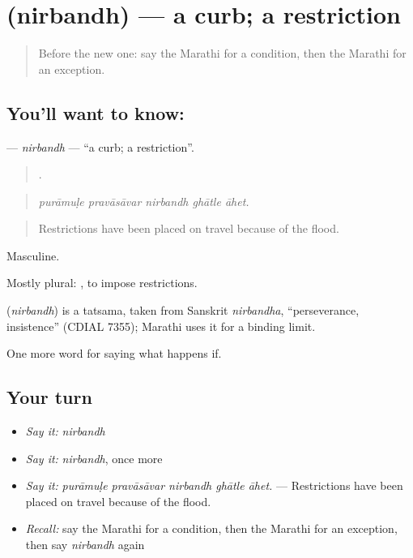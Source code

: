 \section[\texorpdfstring{\mr{निर्बंध} (nirbandh)}{निर्बंध (nirbandh)}]{ (nirbandh) — a curb; a restriction}

\label{lesson:MR-C378-nirbandh}



\begin{quote}
Before the new one: say the Marathi for a condition, then the Marathi for an exception.
\end{quote}

\subsection*{You'll want to know: }
\textbf{} — \emph{nirbandh} — \textquotedblleft{}a curb; a restriction\textquotedblright{}.

\begin{quote}
    .
\end{quote}

\begin{quote}
\emph{purāmuḷe pravāsāvar nirbandh ghātle āhet.}
\end{quote}

\begin{quote}
Restrictions have been placed on travel because of the flood.
\end{quote}

Masculine.

Mostly plural:  , to impose restrictions.

\begin{cousinweb}
\textbf{} (\emph{nirbandh}) is a tatsama, taken from Sanskrit \emph{nirbandha}, \textquotedblleft{}perseverance, insistence\textquotedblright{} (CDIAL 7355); Marathi uses it for a binding limit.
\end{cousinweb}

\begin{grammarlens}[title={What you've built}]
One more word for saying what happens if.
\end{grammarlens}

\subsection*{Your turn}
\begin{itemize}
\raggedright
  \item \emph{Say it:} \emph{nirbandh}
  \item \emph{Say it:} \emph{nirbandh}, once more
  \item \emph{Say it:} \emph{purāmuḷe pravāsāvar nirbandh ghātle āhet.} — Restrictions have been placed on travel because of the flood.
  \item \emph{Recall:} say the Marathi for a condition, then the Marathi for an exception, then say \emph{nirbandh} again
\end{itemize}


